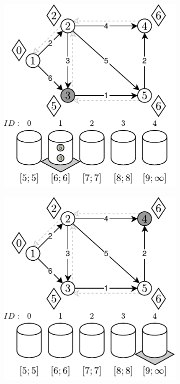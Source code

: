 \begin{figure}[!htbp]
\begin{subfigure}[b]{0.32\textwidth}
		\caption{}
	\end{subfigure}%
	\begin{subfigure}[b]{0.32\textwidth}
		\includegraphics[width=\textwidth]{Chapter_II/OVERFLOW-BUCKET-Example/e.pdf}
		\caption{}
	\end{subfigure}
	\begin{subfigure}[b]{0.32\textwidth}
		\includegraphics[width=\textwidth]{Chapter_II/OVERFLOW-BUCKET-Example/f.pdf}

\end{subfigure}
\end{figure}
